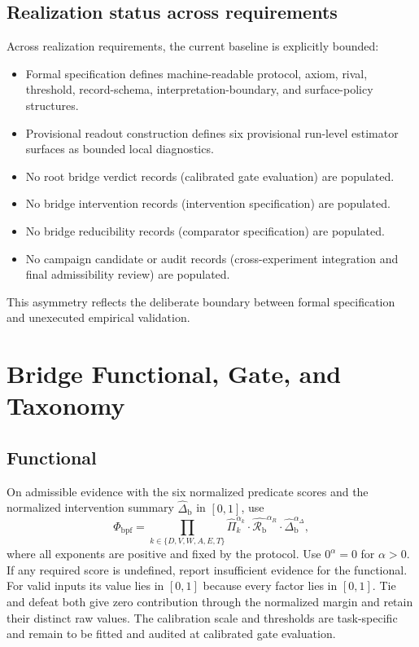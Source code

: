 \documentclass[11pt,a4paper]{article}
\theoremstyle{definition}
\newcommand{\PhiBridge}{\Phi_{\mathrm{bpf}}}
\newcommand{\BridgeMargin}{\mathcal{R}_{\mathrm{b}}}
\begin{document}
\subsection{Realization status across requirements}
Across realization requirements, the current baseline is explicitly bounded:
\begin{itemize}[leftmargin=1.5em]
\item Formal specification defines machine-readable protocol, axiom, rival, threshold, record-schema, interpretation-boundary, and surface-policy structures.
\item Provisional readout construction defines six provisional run-level estimator surfaces as bounded local diagnostics.
\item No root bridge verdict records (calibrated gate evaluation) are populated.
\item No bridge intervention records (intervention specification) are populated.
\item No bridge reducibility records (comparator specification) are populated.
\item No campaign candidate or audit records (cross-experiment integration and final admissibility review) are populated.
\end{itemize}
This asymmetry reflects the deliberate boundary between formal specification and unexecuted empirical validation.

\section{Bridge Functional, Gate, and Taxonomy}
\subsection{Functional}
On admissible evidence with the six normalized predicate scores and the normalized intervention summary $\widehat{\Delta}_{\mathrm b}$ in $[0,1]$, use
\[
 \PhiBridge=\prod_{k\in\{D,V,W,A,E,T\}}\widehat{\Pi}_k^{\alpha_k}
 \cdot\widehat{\BridgeMargin}^{\alpha_R}
 \cdot\widehat{\Delta}_{\mathrm b}^{\alpha_\Delta},
\]
where all exponents are positive and fixed by the protocol. Use $0^\alpha=0$ for $\alpha>0$. If any required score is undefined, report insufficient evidence for the functional. For valid inputs its value lies in $[0,1]$ because every factor lies in $[0,1]$. Tie and defeat both give zero contribution through the normalized margin and retain their distinct raw values. The calibration scale and thresholds are task-specific and remain to be fitted and audited at calibrated gate evaluation.
\end{document}

